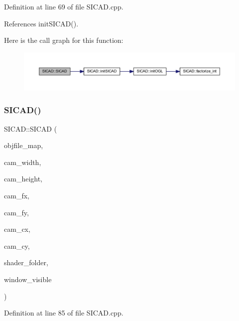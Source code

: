 Definition at line 69 of file S\+I\+C\+A\+D.\+cpp.



References init\+S\+I\+C\+A\+D().

Here is the call graph for this function\+:
\nopagebreak
\begin{figure}[H]
\begin{center}
\leavevmode
\includegraphics[width=350pt]{classSICAD_abcb9bb154f73472447affb9bb16dcec7_cgraph}
\end{center}
\end{figure}
\mbox{\label{classSICAD_a6ddc65ccbfea740515782c4b0dc25a0c}} 
\subsubsection{\texorpdfstring{S\+I\+C\+A\+D()}{SICAD()}\hspace{0.1cm}{\footnotesize\ttfamily [7/9]}}
{\footnotesize\ttfamily S\+I\+C\+A\+D\+::\+S\+I\+C\+AD (\begin{DoxyParamCaption}\item[{const \mbox{\hyperlink{classSICAD_a9e1e1460d4c0f331b4fd015aae4dd721}{Model\+Path\+Container}} \&}]{objfile\+\_\+map,  }\item[{const G\+Lsizei}]{cam\+\_\+width,  }\item[{const G\+Lsizei}]{cam\+\_\+height,  }\item[{const G\+Lfloat}]{cam\+\_\+fx,  }\item[{const G\+Lfloat}]{cam\+\_\+fy,  }\item[{const G\+Lfloat}]{cam\+\_\+cx,  }\item[{const G\+Lfloat}]{cam\+\_\+cy,  }\item[{const std\+::string \&}]{shader\+\_\+folder,  }\item[{const bool}]{window\+\_\+visible }\end{DoxyParamCaption})}



Definition at line 85 of file S\+I\+C\+A\+D.\+cpp.

\mbox{\label{classSICAD_a1d217cbdc1670f8c5885c413e4acbede}} 
